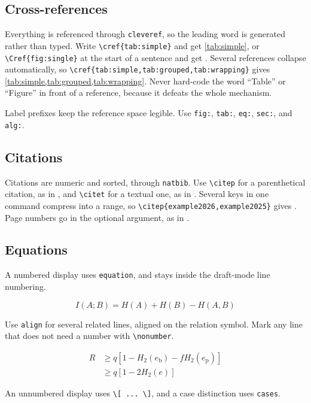 \subsection{Cross-references}
Everything is referenced through \verb|cleveref|, so the leading word is generated rather than typed.
Write \verb|\cref{tab:simple}| and get \cref{tab:simple}, or \verb|\Cref{fig:single}| at the start of a sentence and get .
Several references collapse automatically, so \verb|\cref{tab:simple,tab:grouped,tab:wrapping}| gives \cref{tab:simple,tab:grouped,tab:wrapping}.
Never hard-code the word ``Table'' or ``Figure'' in front of a reference, because it defeats the whole mechanism.

Label prefixes keep the reference space legible.
Use \verb|fig:|, \verb|tab:|, \verb|eq:|, \verb|sec:|, and \verb|alg:|.

\subsection{Citations}
Citations are numeric and sorted, through \verb|natbib|.
Use \verb|\citep| for a parenthetical citation, as in \citep{example2026}, and \verb|\citet| for a textual one, as in \citet{example2026}.
Several keys in one command compress into a range, so \verb|\citep{example2026,example2025}| gives \citep{example2026,example2025}.
Page numbers go in the optional argument, as in \citep[p.~14]{example2026}.

\subsection{Equations}
A numbered display uses \verb|equation|, and stays inside the draft-mode line numbering.

\begin{equation}\label{eq:mutual}
  I(A;B) = H(A) + H(B) - H(A,B)
\end{equation}

Use \verb|align| for several related lines, aligned on the relation symbol.
Mark any line that does not need a number with \verb|\nonumber|.

\begin{align}
  R &\geq q\left[1 - H_2(e_\mathrm{b}) - f H_2(e_\mathrm{p})\right] \nonumber \\
    &\geq q\left[1 - 2H_2(e)\right]
  \label{eq:keyrate}
\end{align}

An unnumbered display uses \verb|\[ ... \]|, and a case distinction uses \verb|cases|.

